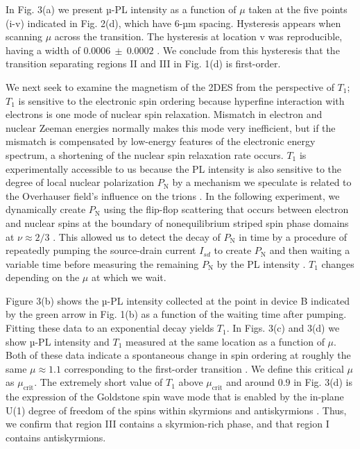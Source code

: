 \documentclass
[aps,prl,twocolumn,superscriptaddress,showpacs,floatfix]{revtex4-1}%
\begin{document}
In Fig. 3(a) we present µ-PL intensity as a function of $\mu$ taken at the five points (i-v) indicated in Fig. 2(d), which have 6-µm spacing. Hysteresis appears when scanning $\mu$ across the transition. The hysteresis at location v was reproducible, having a width of $0.0006~\pm~0.0002$ \cite{SI}. We conclude from this hysteresis that the transition separating regions II and III in Fig. 1(d) is first-order.

We next seek to examine the magnetism of the 2DES from the perspective of $T_1$; $T_1$ is sensitive to the electronic spin ordering because hyperfine interaction with electrons is one mode of nuclear spin relaxation. Mismatch in electron and nuclear Zeeman energies normally makes this mode very inefficient, but if the mismatch is compensated by low-energy features of the electronic energy spectrum, a shortening of the nuclear spin relaxation rate occurs. $T_1$ is experimentally accessible to us because the PL intensity is also sensitive to the degree of local nuclear polarization $P_\text{N}$ by a mechanism we speculate is related to the Overhauser field’s influence on the trions \cite{MoorePRL,Abragam,Coish,note2}. In the following experiment, we dynamically create $P_\text{N}$ using the flip-flop scattering that occurs between electron and nuclear spins at the boundary of nonequilibrium striped spin phase domains at $\nu\approx2/3$ \cite{MoorePRL,MoorePRB}. This allowed us to detect the decay of $P_\text{N}$ in time by a procedure of repeatedly pumping the source-drain current $I_{sd}$ to create $P_\text{N}$ and then waiting a variable time before measuring the remaining $P_\text{N}$ by the PL intensity \cite{SI}. $T_1$ changes depending on the $\mu$ at which we wait.

Figure 3(b) shows the µ-PL intensity collected at the point in device B indicated by the green arrow in Fig. 1(b) as a function of the waiting time after pumping. Fitting these data to an exponential decay yields $T_{1}$. In Figs. 3(c) and 3(d) we show µ-PL intensity and $T_{1}$ measured at the same location as a function of $\mu$. Both of these data indicate a spontaneous change in spin ordering at roughly the same $\mu\approx1.1$ corresponding to the first-order transition \cite{note5}. We define this critical $\mu$ as $\mu_{\text{crit}}$. The extremely short value of $T_{1}$ above $\mu_{\text{crit}}$ and around $0.9$ in Fig. 3(d) is the expression of the Goldstone spin wave mode that is enabled by the in-plane U(1) degree of freedom of the spins within skyrmions and antiskyrmions \cite{Cote}. Thus, we confirm that region III contains a skyrmion-rich phase, and that region I contains antiskyrmions.
\end{document}
